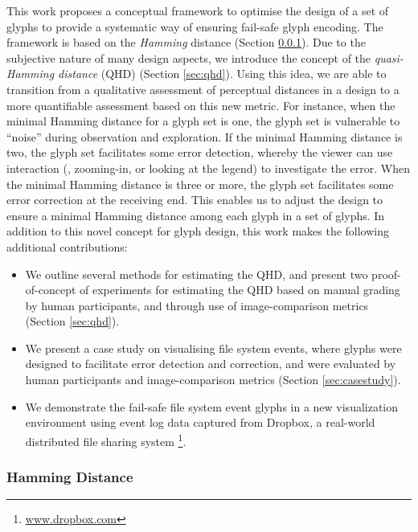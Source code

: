 This work proposes a conceptual framework to optimise the design of a set of glyphs to provide a systematic way of ensuring fail-safe glyph encoding.
The framework is based on the \emph{Hamming} distance (Section \ref{sec:hamming}).
Due to the subjective nature of many design aspects, we introduce the concept of the \emph{quasi-Hamming distance} (QHD) (Section \ref{sec:qhd}).
Using this idea, we are able to transition from a qualitative assessment of perceptual distances in a design to a more quantifiable assessment based on this new metric.
For instance, when the minimal Hamming distance for a glyph set is one, the glyph set is vulnerable to ``noise'' during observation and exploration. 
If the minimal Hamming distance is two, the glyph set facilitates some error detection, whereby the viewer can use interaction (\eg, zooming-in, or looking at the legend) to investigate the error.
When the minimal Hamming distance is three or more, the glyph set facilitates some error correction at the receiving end.
This enables us to adjust the design to ensure a minimal Hamming distance among each glyph in a set of glyphs.
In addition to this novel concept for glyph design, this work makes the following additional contributions:  
%
\begin{itemize}
\vspace{-2mm}
\item
We outline several methods for estimating the QHD, and present two proof-of-concept of experiments for estimating the QHD based on manual grading by human participants, and through use of image-comparison metrics (Section \ref{sec:qhd}).
\vspace{-2mm}
\item
We present a case study on visualising file system events, where glyphs were designed to facilitate error detection and correction, and were evaluated by human participants and image-comparison metrics (Section \ref{sec:casestudy}).
\vspace{-2mm}
\item
We demonstrate the fail-safe file system event glyphs in a new visualization environment using event log data captured from Dropbox, a real-world distributed file sharing system \footnote{\url{www.dropbox.com}}.
\end{itemize}

\subsubsection{Hamming Distance}
\label{sec:hamming}

